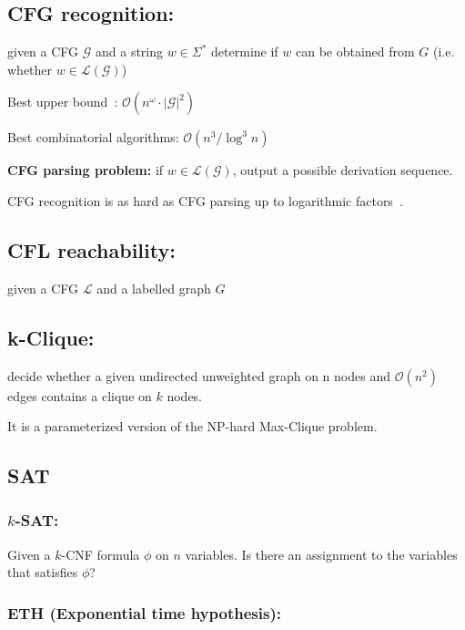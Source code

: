 \documentclass{amsart}
\begin{document}
	\subsection{CFG recognition:}
	
	given a CFG $\mathcal{G}$ and a string $w \in \Sigma^*$ determine if $w$ can be obtained from $G$ (i.e. whether $w \in \mathcal{L}(\mathcal{G})$)
	
	Best upper bound~\cite{valiant1975general}: $\mathcal{O}(n^{\omega} \cdot |\mathcal{G}|^2)$
	
	Best combinatorial algorithms: $\mathcal{O}(n^3 / \log^3 n)$
	
	\textbf{CFG parsing problem:} if $w \in \mathcal{L}(\mathcal{G})$, output a
	possible derivation sequence.
	
	CFG recognition is as hard as CFG parsing up to logarithmic factors~\cite{10.5555/646233.682379}.
	
	\subsection{CFL reachability:}
	
	given a CFG $\mathcal{L}$ and a labelled graph $G$
	
	\subsection{k-Clique:}
	
	decide whether a given undirected unweighted graph on n nodes and $\mathcal{O}(n^2)$ edges contains a clique on $k$ nodes.
	
	It is a parameterized version of the NP-hard Max-Clique problem.
	
	\subsection{SAT}
	
	\subsubsection{$k$-SAT:}
	
	Given a $k$-CNF formula $\phi$ on $n$ variables. Is there an assignment to the variables that satisfies $\phi$?
	
	\subsubsection{ETH (Exponential time hypothesis):}
	
\end{document}
